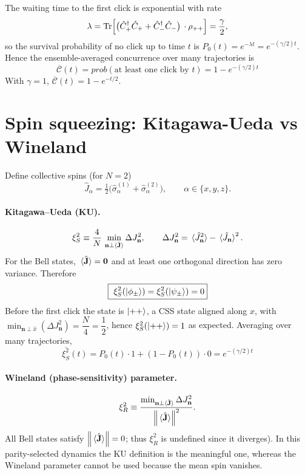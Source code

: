 \documentclass[12pt,a4paper]{article}
\begin{document}
	The waiting time to the first click is exponential with rate
	\[
	\lambda=\Tr\!\Big[\big(\hat C_+^\dagger \hat C_+ + \hat C_-^\dagger \hat C_-\big)\, \cdot \rho_{++}\Big]=\frac{\gamma}{2},
	\]
	so the survival probability of no click up to time \(t\) is \(P_0(t)=e^{-\lambda t}=e^{-(\gamma/2)t}\).
	Hence the ensemble-averaged concurrence over many trajectories is
	\[
	\boxed{\ \overline{\mathcal{C}}(t)= prob (\text{at least one click by }t)=1-e^{-(\gamma/2)t}\ } 
	\]
	With \(\gamma=1\), \(\overline{\mathcal{C}}(t)=1-e^{-t/2}\).
	

	
	\section{Spin squeezing: Kitagawa-Ueda vs Wineland}
	
	Define collective spins (for \(N=2\))
	\[
	\hat J_\alpha=\tfrac{1}{2}\big(\hat\sigma_\alpha^{(1)}+\hat\sigma_\alpha^{(2)}\big),\qquad \alpha\in\{x,y,z\}.
	\]
	
	\paragraph{Kitagawa--Ueda (KU).}
	\[
	\xi_S^2 \equiv \frac{4}{N}\,\min_{\mathbf{n}\perp \expval*{\hat{\mathbf{J}}}}
	\Delta J_{\mathbf{n}}^2,\qquad
	\Delta J_{\mathbf{n}}^2=\expval*{\hat J_{\mathbf{n}}^2}-\expval*{\hat J_{\mathbf{n}}}^2.
	\]
	For the Bell states, \(\expval*{\hat{\mathbf{J}}}=\mathbf{0}\) and at least one orthogonal direction has zero variance. Therefore
	\[
	\boxed{\ \xi_S^2(\ket{\phi_\pm})=\xi_S^2(\ket{\psi_\pm}) = 0} 
	\]
	Before the first click the state is \(\ket{++}\), a CSS state aligned along \(x\), with
	\(\min_{\mathbf{n}\perp \hat x}(\Delta J_{\mathbf{n}}^2)=\dfrac{N}{4}=\dfrac{1}{2}\), hence \(\xi_S^2(\ket{++})=1\) as expected.
	Averaging over many trajectories,
	\[
	\boxed{\ \overline{\xi_S^2}(t)=P_0(t)\cdot 1+(1-P_0(t))\cdot 0=e^{-(\gamma/2)t}\ } 
	\]
	
	\paragraph{Wineland (phase-sensitivity) parameter.}
	\[
	\xi_R^2 \equiv \frac{\min_{\mathbf{n}\perp \expval*{\hat{\mathbf{J}}}}
		\Delta J_{\mathbf{n}}^2}{\norm{\expval*{\hat{\mathbf{J}}}}^2}.
	\]
	All Bell states satisfy \(\norm{\expval*{\hat{\mathbf{J}}}}=0\); thus \(\xi_R^2\) is undefined since it diverges).
	In this parity-selected dynamics the KU definition is the meaningful one, whereas the Wineland parameter cannot be used because the mean spin vanishes.
	
\end{document}
